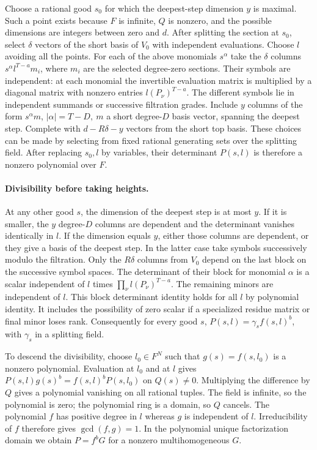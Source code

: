 Choose a rational good \(s_0\) for which the deepest-step dimension
\(y\) is maximal. Such a point exists because \(F\) is infinite, \(Q\)
is nonzero, and the possible dimensions are integers between zero and
\(d\). After splitting the section at \(s_0\), select \(\delta\)
vectors of the short basis of \(V_0\) with independent evaluations.
Choose \(l\) avoiding all the points. For each of the above monomials
\(s^\alpha\) take the \(\delta\) columns \(s^\alpha l^{T-a}m_i\),
where \(m_i\) are the selected degree-zero sections. Their symbols are
independent: at each monomial the invertible evaluation matrix is
multiplied by a diagonal matrix with nonzero entries \(l(P_\nu)^{T-a}\).
The different symbols lie in independent summands or successive
filtration grades. Include \(y\) columns of the form \(s^\alpha m\),
\(|\alpha|=T-D,\ m\) a short degree-\(D\) basis vector, spanning the
deepest step. Complete with \(d-R\delta-y\) vectors from the short top
basis. These choices can be made by selecting from fixed rational
generating sets over the splitting field. After replacing \(s_0,l\)
by variables, their determinant \(P(s,l)\) is therefore a nonzero
polynomial over \(F\).

\paragraph{Divisibility before taking heights.}
At any other good \(s\), the dimension of the deepest step is at most
\(y\). If it is smaller, the \(y\) degree-\(D\) columns are dependent
and the determinant vanishes identically in \(l\). If the dimension
equals \(y\), either those columns are dependent, or they give a basis
of the deepest step. In the latter case take symbols successively
modulo the filtration. Only the \(R\delta\) columns from \(V_0\)
depend on the last block on the successive symbol spaces. The
determinant of their block for monomial \(\alpha\) is a scalar
independent of \(l\) times \(\prod_\nu l(P_\nu)^{T-a}\).
The remaining minors are independent of \(l\). This block determinant
identity holds for all \(l\) by polynomial identity. It includes the
possibility of zero scalar if a specialized residue matrix or final minor
loses rank. Consequently for every good \(s\),
\(P(s,l)=\gamma_s f(s,l)^b\), with \(\gamma_s\) in a splitting field.

To descend the divisibility, choose \(l_0\in F^N\) such that
\(g(s)=f(s,l_0)\) is a nonzero polynomial. Evaluation at \(l_0\)
and at \(l\) gives \(P(s,l)g(s)^b=f(s,l)^bP(s,l_0)\) on \(Q(s)\ne0\).
Multiplying the difference by \(Q\) gives a polynomial vanishing on
all rational tuples. The field is infinite, so the polynomial is zero;
the polynomial ring is a domain, so \(Q\) cancels. The polynomial \(f\)
has positive degree in \(l\) whereas \(g\) is independent of \(l\).
Irreducibility of \(f\) therefore gives \(\gcd(f,g)=1\).
In the polynomial unique factorization domain we obtain
\(P=f^bG\) for a nonzero multihomogeneous \(G\).

